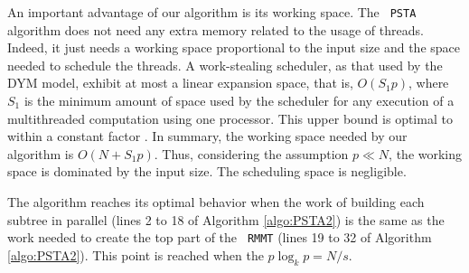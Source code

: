 An important advantage of our algorithm is its working space. The {\tt
PSTA} algorithm does not need any extra memory related to the usage of
threads. Indeed, it just needs a working space proportional to the
input size and the space needed to schedule the threads. A
work-stealing scheduler, as that used by the DYM model, exhibit at
most a linear expansion space, that is, $O(S_1p)$, where $S_1$ is the
minimum amount of space used by the scheduler for any execution of a
multithreaded computation using one processor. This upper bound is
optimal to within a constant factor
\cite{Blumofe:1999:SMC:324133.324234}. In summary, the working space
needed by our algorithm is $O(N+S_1p)$. Thus, considering the
assumption $p\ll N$, the working space is dominated by the input
size. The scheduling space is negligible.

The algorithm reaches its optimal behavior when the work of building
each subtree in parallel (lines 2 to 18 of Algorithm \ref{algo:PSTA2})
is the same as the work needed to create the top part of the {\tt
RMMT} (lines 19 to 32 of Algorithm \ref{algo:PSTA2}). This point is
reached when the $p\log_{k}p=N/s$. 